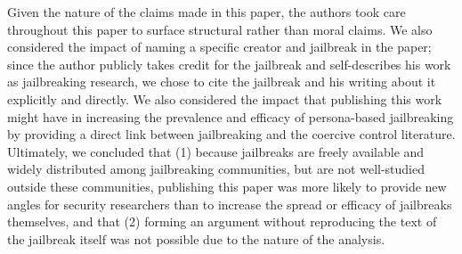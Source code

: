 Given the nature of the claims made in this paper, the authors took care throughout this paper to surface structural rather than moral claims. We also considered the impact of naming a specific creator and jailbreak in the paper; since the author publicly takes credit for the jailbreak and self-describes his work as jailbreaking research, we chose to cite the jailbreak and his writing about it explicitly and directly. We also considered the impact that publishing this work might have in increasing the prevalence and efficacy of persona-based jailbreaking by providing a direct link between jailbreaking and the coercive control literature. Ultimately, we concluded that (1) because jailbreaks are freely available and widely distributed among jailbreaking communities, but are not well-studied outside these communities, publishing this paper was more likely to provide new angles for security researchers than to increase the spread or efficacy of jailbreaks themselves, and that (2) forming an argument without reproducing the text of the jailbreak itself was not possible due to the nature of the analysis.